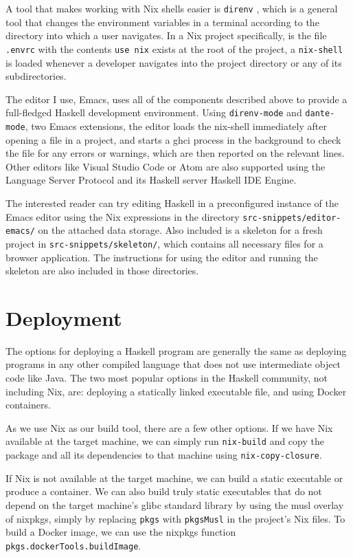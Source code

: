 \documentclass[english,zadani,odsaz]{fitthesis}
\begin{document}
A tool that makes working with Nix shells easier is \texttt{direnv} \cite{direnv}, which is
a general tool that changes the environment variables in a terminal according to
the directory into which a user navigates. In a Nix project specifically, is the
file \texttt{.envrc} with the contents \texttt{use nix} exists at the root of the project, a
\texttt{nix-shell} is loaded whenever a developer navigates into the project directory or
any of its subdirectories.

The editor I use, Emacs, uses all of the components described above to provide a
full-fledged Haskell development environment. Using \texttt{direnv-mode} and \texttt{dante-mode},
two Emacs extensions, the editor loads the nix-shell immediately after opening a
file in a project, and starts a ghci process in the background to check the file
for any errors or warnings, which are then reported on the relevant lines.
Other editors like Visual Studio Code or Atom are also supported using the
Language Server Protocol and its Haskell server Haskell IDE Engine.

The interested reader can try editing Haskell in a preconfigured instance of the
Emacs editor using the Nix expressions in the directory
\texttt{src-snippets/editor-emacs/} on the attached data storage. Also included is a
skeleton for a fresh project in \texttt{src-snippets/skeleton/}, which contains all
necessary files for a browser application. The instructions for using the editor
and running the skeleton are also included in those directories.

\section{Deployment}
\label{sec:orgc00407c}
The options for deploying a Haskell program are generally the same as deploying
programs in any other compiled language that does not use intermediate object
code like Java. The two most popular options in the Haskell community, not
including Nix, are: deploying a statically linked executable file, and using
Docker containers.

As we use Nix as our build tool, there are a few other options. If we have Nix
available at the target machine, we can simply run \texttt{nix-build} and copy the
package and all its dependencies to that machine using \texttt{nix-copy-closure}.

If Nix is not available at the target machine, we can build a static executable
or produce a container. We can also build truly static executables that do not
depend on the target machine's glibc standard library by using the musl overlay
of nixpkgs, simply by replacing \texttt{pkgs} with \texttt{pkgsMusl} in the project's Nix files.
To build a Docker image, we can use the nixpkgs function
\texttt{pkgs.dockerTools.buildImage}.
\end{document}
